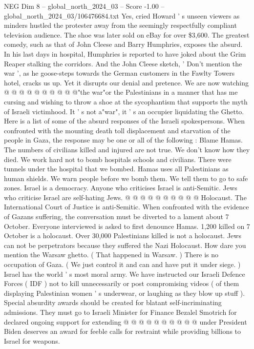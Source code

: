 \begin{textsample}{NEG Dim 8 – global\_north\_2024\_03 – Score -1.00 – global\_north\_2024\_03/106476684.txt}
Yes, cried Howard ' s unseen viewers as minders hustled the protester away from the seemingly respectfully compliant television audience.
The shoe was later sold on eBay for over \$3,600.
The greatest comedy, such as that of John Cleese and Barry Humphries, exposes the absurd.
In his last days in hospital, Humphries is reported to have joked about the Grim Reaper stalking the corridors.
And the John Cleese sketch, ' Don't mention the war ', as he goose-steps towards the German customers in the Fawlty Towers hotel, cracks us up.
Yet it disrupts our denial and pretence.
We are now watching @ @ @ @ @ @ @ @ @ @"the war"or the Palestinians in a manner that has me cursing and wishing to throw a shoe at the sycophantism that supports the myth of Israeli victimhood.
It ' s not a"war", it ' s an occupier liquidating the Ghetto.
Here is a list of some of the absurd responses of the Israeli spokespersons.
When confronted with the mounting death toll displacement and starvation of the people in Gaza, the response may be one or all of the following : Blame Hamas.
The numbers of civilians killed and injured are not true.
We don't know how they died.
We work hard not to bomb hospitals schools and civilians.
There were tunnels under the hospital that we bombed.
Hamas uses all Palestinians as human shields.
We warn people before we bomb them.
We tell them to go to safe zones.
Israel is a democracy.
Anyone who criticises Israel is anti-Semitic.
Jews who criticise Israel are self-hating Jews. @ @ @ @ @ @ @ @ @ @ Holocaust.
The International Court of Justice is anti-Semitic.
When confronted with the evidence of Gazans suffering, the conversation must be diverted to a lament about 7 October.
Everyone interviewed is asked to first denounce Hamas. 1,200 killed on 7 October is a holocaust.
Over 30,000 Palestinians killed is not a holocaust.
Jews can not be perpetrators because they suffered the Nazi Holocaust.
How dare you mention the Warsaw ghetto. ( That happened in Warsaw. ) There is no occupation of Gaza. ( We just control it and can and have put it under siege. ) Israel has the world ' s most moral army.
We have instructed our Israeli Defence Forces ( IDF ) not to kill unnecessarily or post compromising videos ( of them displaying Palestinian women ' s underwear, or laughing as they blow up stuff ).
Special absurdity awards should be created for blatant self-incriminating admissions.
They must go to Israeli Minister for Finance Bezalel Smotrich for declared ongoing support for extending @ @ @ @ @ @ @ @ @ @ under President Biden deserves an award for feeble calls for restraint while providing billions to Israel for weapons.

\end{textsample}

